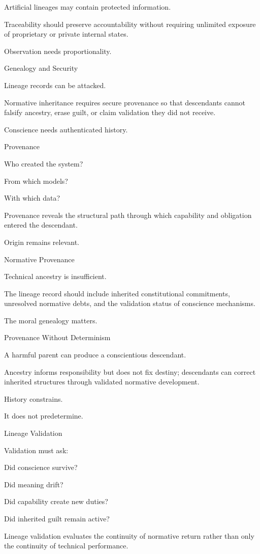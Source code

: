 Artificial lineages may contain protected information.

Traceability should preserve accountability without requiring unlimited exposure of proprietary or private internal states.

Observation needs proportionality.

Genealogy and Security

Lineage records can be attacked.

Normative inheritance requires secure provenance so that descendants cannot falsify ancestry, erase guilt, or claim validation they did not receive.

Conscience needs authenticated history.

Provenance

Who created the system?

From which models?

With which data?

Provenance reveals the structural path through which capability and obligation entered the descendant.

Origin remains relevant.

Normative Provenance

Technical ancestry is insufficient.

The lineage record should include inherited constitutional commitments, unresolved normative debts, and the validation status of conscience mechanisms.

The moral genealogy matters.

Provenance Without Determinism

A harmful parent can produce a conscientious descendant.

Ancestry informs responsibility but does not fix destiny; descendants can correct inherited structures through validated normative development.

History constrains.

It does not predetermine.

Lineage Validation

Validation must ask:

Did conscience survive?

Did meaning drift?

Did capability create new duties?

Did inherited guilt remain active?

Lineage validation evaluates the continuity of normative return rather than only the continuity of technical performance.

